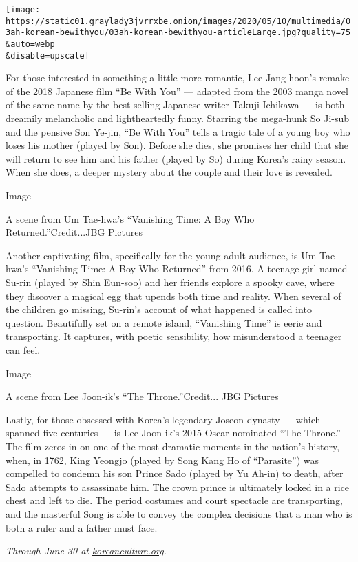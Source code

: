 \texttt{[image: https://static01.graylady3jvrrxbe.onion/images/2020/05/10/multimedia/03ah-korean-bewithyou/03ah-korean-bewithyou-articleLarge.jpg?quality=75\\\&auto=webp\\\&disable=upscale]}

For those interested in something a little more romantic, Lee
Jang-hoon's remake of the 2018 Japanese film ``Be With You'' --- adapted
from the 2003 manga novel of the same name by the best-selling Japanese
writer Takuji Ichikawa --- is both dreamily melancholic and
lightheartedly funny. Starring the mega-hunk So Ji-sub and the pensive
Son Ye-jin, ``Be With You'' tells a tragic tale of a young boy who loses
his mother (played by Son). Before she dies, she promises her child that
she will return to see him and his father (played by So) during Korea's
rainy season. When she does, a deeper mystery about the couple and their
love is revealed.

Image

A scene from Um Tae-hwa's ``Vanishing Time: A Boy Who
Returned.''Credit...JBG Pictures

Another captivating film, specifically for the young adult audience, is
Um Tae-hwa's ``Vanishing Time: A Boy Who Returned'' from 2016. A teenage
girl named Su-rin (played by Shin Eun-soo) and her friends explore a
spooky cave, where they discover a magical egg that upends both time and
reality. When several of the children go missing, Su-rin's account of
what happened is called into question. Beautifully set on a remote
island, ``Vanishing Time'' is eerie and transporting. It captures, with
poetic sensibility, how misunderstood a teenager can feel.

Image

A scene from Lee Joon-ik's ``The Throne.''Credit... JBG Pictures

Lastly, for those obsessed with Korea's legendary Joseon dynasty ---
which spanned five centuries --- is Lee Joon-ik's 2015 Oscar nominated
``The Throne.'' The film zeros in on one of the most dramatic moments in
the nation's history, when, in 1762, King Yeongjo (played by Song Kang
Ho of ``Parasite'') was compelled to condemn his son Prince Sado (played
by Yu Ah-in) to death, after Sado attempts to assassinate him. The crown
prince is ultimately locked in a rice chest and left to die. The period
costumes and court spectacle are transporting, and the masterful Song is
able to convey the complex decisions that a man who is both a ruler and
a father must face.

\emph{Through June 30 at}
\href{http://www.koreanculture.org/films/kmovieathome}{\emph{koreanculture.org}}\emph{.}

